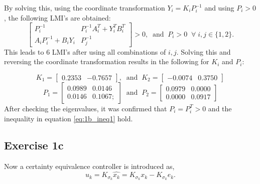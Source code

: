 By solving this, using the coordinate transformation $Y_i = K_i P_i^{-1}$ and using $P_i > 0$, the following LMI's are obtained:
\begin{equation}
    \begin{bmatrix} P_i^{-1} & P_i^{-1} A_i^T + Y_i^T B_i^T \\ A_i P_i^{-1} + B_i Y_i & P_j^{-1} \end{bmatrix} > 0, \; \; \text{and} \; \; P_i > 0 \; \; \forall \; i,j \in \{1,2\}.
    \label{eq:ex1b_LMI1}
\end{equation}
This leads to 6 LMI's after using all combinations of $i,j$. Solving this and reversing the coordinate transformation results in the following for $K_i$ and $P_i$:

\begin{equation}
    K_1 = \begin{bmatrix} 0.2353  & -0.7657 \end{bmatrix}, \; \; \text{and} \; \;  
    K_2 = \begin{bmatrix} -0.0074  & 0.3750 \end{bmatrix}
    \label{eq:ex1b_Kiresults}
\end{equation}
\begin{equation}
     P_1 = \begin{bmatrix} 0.0989 & 0.0146 \\ 0.0146 & 0.1067; \end{bmatrix} \; \; \text{and} \; \; 
    P_2 = \begin{bmatrix} 0.0979  & 0.0000\\ 0.0000 & 0.0917
    \end{bmatrix} 
    \label{eq:ex1b_Piresults}
\end{equation}
After checking the eigenvalues, it was confirmed that $P_i = P_i^T >0$ and the inequality in equation \eqref{eq:1b_ineq1} hold. 

\subsection{Exercise 1c}

Now a certainty equivalence controller is introduced as,
\begin{equation}
    u_k = K_{\sigma_k} \hat{x_k} = K_{\sigma_k}x_k - K_{\sigma_k} e_k.
    \label{eq:ex1c_controller}
\end{equation}

